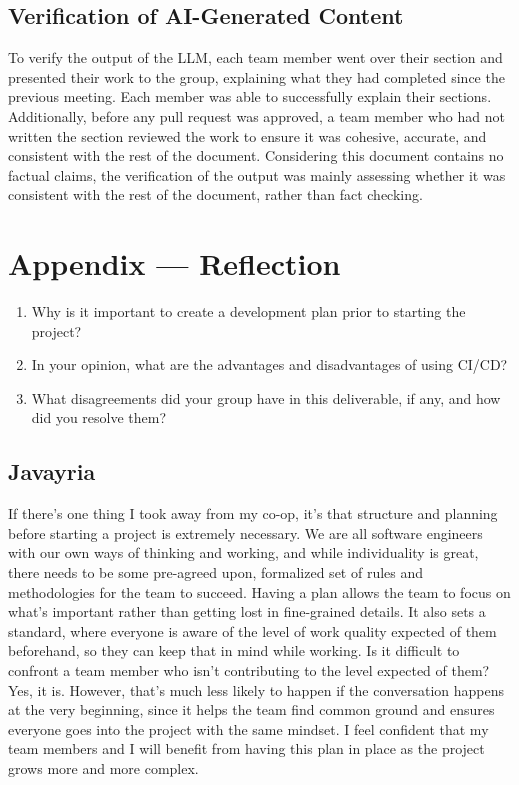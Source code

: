 \documentclass{article}
\begin{document}
\subsection{Verification of AI-Generated Content}
To verify the output of the LLM, each team member went over their section and presented their work to the group, explaining what they had completed since the previous meeting. 
Each member was able to successfully explain their sections. 
Additionally, before any pull request was approved, a team member who had not written the section reviewed the work to ensure it was cohesive, accurate, and consistent with the rest of the document. 
Considering this document contains no factual claims, the verification of the output was mainly assessing whether it was consistent with the rest of the document, rather than fact checking.

\newpage{}

\section*{Appendix --- Reflection}



\begin{enumerate}
    \item Why is it important to create a development plan prior to starting the
    project?
    \item In your opinion, what are the advantages and disadvantages of using
    CI/CD?
    \item What disagreements did your group have in this deliverable, if any,
    and how did you resolve them?
\end{enumerate}

\subsection*{Javayria}
If there's one thing I took away from my co-op, it's that structure and planning 
before starting a project is extremely necessary. We are all software engineers with our own 
ways of thinking and working, and while individuality is great, there needs to be some pre-agreed upon, 
formalized set of rules and methodologies for the team to succeed. Having a plan allows the team to focus on
 what's important rather than getting lost in fine-grained details. It also sets a standard, where everyone is aware of the level 
 of work quality expected of them beforehand, so they can keep that in mind while working. 
 Is it difficult to confront a team member who isn't contributing to the level expected of them? Yes, it is. 
 However, that's much less likely to happen if the conversation happens at the very beginning, since it helps the team find common
ground and ensures everyone goes into the project with the same mindset. I feel confident that my team members and I will benefit from
having this plan in place as the project grows more and more complex.
\end{document}
